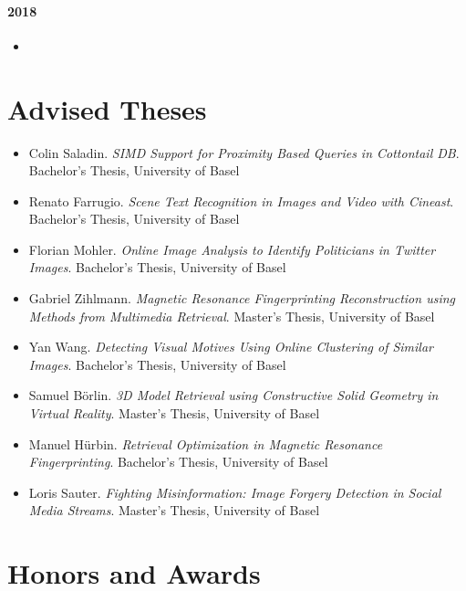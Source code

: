 \paragraph{2018}
\begin{itemize}
	\item {}
\end{itemize}

\section*{Advised Theses}

\begin{itemize}
	\item Colin Saladin. \emph{SIMD Support for Proximity Based Queries in Cottontail DB}. Bachelor's Thesis, University of Basel
	\item Renato Farrugio. \emph{Scene Text Recognition in Images and Video with Cineast}. Bachelor's Thesis, University of Basel
	\item Florian Mohler. \emph{Online Image Analysis to Identify Politicians in Twitter Images}. Bachelor's Thesis, University of Basel
	\item Gabriel Zihlmann. \emph{Magnetic Resonance Fingerprinting Reconstruction using Methods from Multimedia Retrieval}. Master's Thesis, University of Basel
	\item Yan Wang. \emph{Detecting Visual Motives Using Online Clustering of Similar Images}. Bachelor's Thesis, University of Basel
	\item Samuel Börlin. \emph{3D Model Retrieval using Constructive Solid Geometry in Virtual Reality}. Master's Thesis, University of Basel
	\item Manuel Hürbin. \emph{Retrieval Optimization in Magnetic Resonance Fingerprinting}. Bachelor's Thesis, University of Basel
	\item Loris Sauter. \emph{Fighting Misinformation: Image Forgery Detection in Social Media Streams}. Master's Thesis, University of Basel
\end{itemize}

\section*{Honors and Awards}

